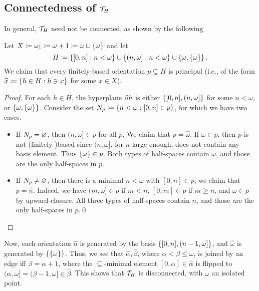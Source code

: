 \documentclass{amsart}
\begin{document}
    \subsection{Connectedness of $\mc{T}_H$}

    In general, $\mc{T}_H$ need not be connected, as shown by the following

    \begin{example}[Tserunyan]\label{line}
        Let $X\coloneqq\omega_1\coloneqq\omega+1\coloneqq\omega\sqcup\l\{\omega\r\}$ and let
        \begin{equation*}
            H\coloneqq\l\{[0,n]\st n<\omega\r\}\cup\l\{(n,\omega]\st n<\omega\r\}\cup\l\{\omega,\l\{\omega\r\}\r\}.
        \end{equation*}
        We claim that every finitely-based orientation $p\subseteq H$ is principal (i.e., of the form $\widehat{x}\coloneqq\l\{h\in H\st h\ni x\r\}$ for some $x\in X$).
        \begin{center}
            \vspace{0.05in}
            \begin{minipage}{0.95\textwidth}
                \begin{proof}
                    For each $h\in H$, the hyperplane $\del h$ is either $\l\{[0,n],(n,\omega]\r\}$ for some $n<\omega$, or $\l\{\omega,\l\{\omega\r\}\r\}$. Consider the set $N_p\coloneqq\l\{n<\omega\st[0,n]\in p\r\}$, for which we have two cases.
                    \begin{itemize}
                        \item If $N_p=\em$, then $(n,\omega]\in p$ for all $p$. We claim that $p=\widehat{\omega}$. If $\omega\in p$, then $p$ is not (finitely-)based since $(n,\omega]$, for $n$ large enough, does not contain any basis element. Thus $\l\{\omega\r\}\in p$. Both types of half-spaces contain $\omega$, and those are the only half-spaces in $p$.
                        \item If $N_p\neq\em$, then there is a minimal $n<\omega$ with $[0,n]\in p$; we claim that $p=\widehat{n}$. Indeed, we have $(m,\omega]\in p$ if $m<n$, $[0,m]\in p$ if $m\geq n$, and $\omega\in p$ by upward-closure. All three types of half-spaces contain $n$, and those are the only half-spaces in $p$.\qed
                    \end{itemize}
                \end{proof}
            \end{minipage}
            \vspace{0.05in}
        \end{center}
        Now, each orientation $\widehat{n}$ is generated by the basis $\l\{[0,n],(n-1,\omega]\r\}$, and $\widehat{\omega}$ is generated by $\l\{\l\{\omega\r\}\r\}$. Thus, we see that $\widehat{\alpha},\widehat{\beta}$, where $\alpha<\beta\leq\omega$, is joined by an edge iff $\beta=\alpha+1$, where the $\subseteq$-minimal element $[0,\alpha]\in\widehat{\alpha}$ is flipped to $(\alpha,\omega]=(\beta-1,\omega]\in\widehat{\beta}$. This shows that $\mc{T}_H$ is disconnected, with $\omega$ an isolated point.
    \end{example}
\end{document}
